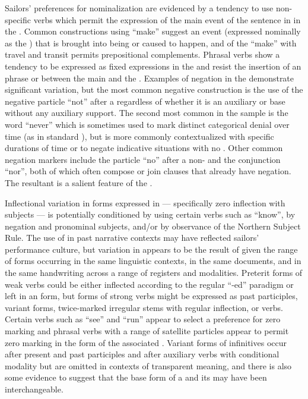 Sailors’ preferences for nominalization are evidenced by a tendency to use non-specific verbs which permit the expression of the main event of the sentence in  in the . Common constructions using “make” suggest an event (expressed nominally as the ) that is brought into being or caused to happen, and  of the  “make” with travel and transit permits prepositional complements. Phrasal verbs show a tendency to be expressed as fixed expressions in the  and resist the insertion of an  phrase or  between the main  and the . Examples of negation in the  demonstrate significant variation, but the most common negative construction is the use of the negative particle “not” after a  regardless of whether it is an auxiliary or base  without any auxiliary support. The second most common  in the sample is the word “never” which is sometimes used to mark distinct categorical denial over time (as in standard ), but is more commonly contextualized with specific durations of time or to negate indicative  situations with no . Other common negation markers include the particle “no” after a non- and the conjunction “nor”, both of which often compose or join clauses that already have negation. The resultant  is a salient feature of the . 

Inflectional variation in  forms expressed in  — specifically zero inflection with  subjects — is potentially conditioned by using certain verbs such as “know”, by negation and  pronominal subjects, and/or by observance of the Northern Subject Rule. The use of  in past narrative contexts may have reflected sailors’ performance culture, but variation in  appears to be the result of  given the range of forms occurring in the same linguistic contexts, in the same documents, and in the same handwriting across a range of registers and modalities. Preterit forms of weak verbs could be either inflected according to the regular “-ed” paradigm or left in an  form, but  forms of strong verbs might be expressed as past participles, variant  forms, twice-marked irregular stems with regular inflection, or  verbs. Certain verbs such as “see” and “run” appear to select a preference for zero marking and phrasal verbs with a range of satellite particles appear to permit zero marking in the  form of the associated . Variant forms of infinitives occur after present and past participles and after auxiliary verbs with conditional modality but are omitted in contexts of transparent meaning, and there is also some evidence to suggest that the base form of a  and its  may have been interchangeable.

